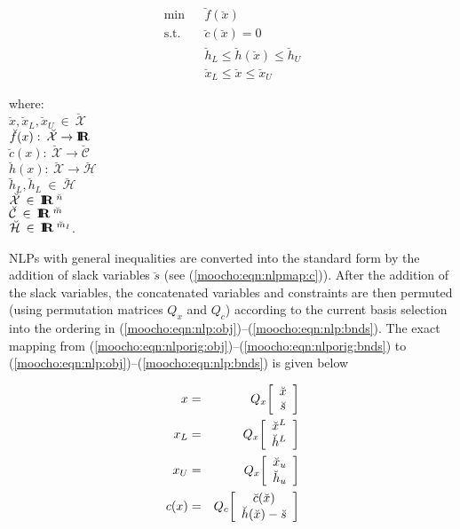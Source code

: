\documentclass[pdf,ps2pdf,11pt]{SANDreport}
\begin{document}
{{\bsinglespace
\begin{eqnarray}
\mbox{min}  &  & \breve{f}(\breve{x})                                     \label{moocho:eqn:nlporig:obj} \\
\mbox{s.t.} &  & \breve{c}(\breve{x}) = 0                                 \label{moocho:eqn:nlporig:equ} \\
            &  & \breve{h}_L \leq \breve{h}(\breve{x}) \leq \breve{h}_U   \label{moocho:eqn:nlporig:inequ} \\
            &  & \breve{x}_L \leq \breve{x}            \leq \breve{x}_U   \label{moocho:eqn:nlporig:bnds}
\end{eqnarray}
\begin{tabbing}
\hspace{4ex}where:\hspace{5ex}\= \\
\>	$\breve{x}, \breve{x}_L, \breve{x}_U \:\in\:\breve{\mathcal{X}}$ \\
\>	$\breve{f}(x) : \:\breve{\mathcal{X}} \rightarrow \mbox{\textbf{I}}\hspace{-0.6ex}\mbox{\textbf{R}}$ \\
\>	$\breve{c}(x) : \:\breve{\mathcal{X}} \rightarrow \breve{\mathcal{C}}$ \\
\>	$\breve{h}(x) : \:\breve{\mathcal{X}} \rightarrow \breve{\mathcal{H}}$ \\
\>	$\breve{h}_L, \breve{h}_L \:\in\:\breve{\mathcal{H}}$ \\
\>	$\breve{\mathcal{X}} \:\in\:\mbox{\textbf{I}}\hspace{-0.6ex}\mbox{\textbf{R}}\:^{\breve{n}}$ \\
\>	$\breve{\mathcal{C}} \:\in\:\mbox{\textbf{I}}\hspace{-0.6ex}\mbox{\textbf{R}}\:^{\breve{m}}$ \\
\>	$\breve{\mathcal{H}} \:\in\:\mbox{\textbf{I}}\hspace{-0.6ex}\mbox{\textbf{R}}\:^{\breve{m}_I}$.
\end{tabbing}
\esinglespace}

NLPs with general inequalities are converted into the standard form by
the addition of slack variables $\breve{s}$ (see
(\ref{moocho:eqn:nlpmap:c})).  After the addition of the slack
variables, the concatenated variables and constraints are then
permuted (using permutation matrices $Q_x$ and $Q_c$) according to the
current basis selection into the ordering in
(\ref{moocho:eqn:nlp:obj})--(\ref{moocho:eqn:nlp:bnds}).  The exact
mapping from
(\ref{moocho:eqn:nlporig:obj})--(\ref{moocho:eqn:nlporig:bnds}) to
(\ref{moocho:eqn:nlp:obj})--(\ref{moocho:eqn:nlp:bnds}) is given below

{\bsinglespace
\begin{eqnarray}
x & = & Q_x {\bmat{c} \breve{x} \\ \breve{s} \emat} \label{moocho:eqn:nlpmap:x} \\
x_L & = & Q_x {\bmat{c} \breve{x}^L \\ \breve{h}^L \emat} \label{moocho:eqn:nlpmap:xl} \\
x_U & = & Q_x {\bmat{c} \breve{x}_u \\ \breve{h}_u \emat} \label{moocho:eqn:nlpmap:xu} \\
c(x) & = & Q_c {\bmat{c} \breve{c}(\breve{x}) \\ \breve{h}(\breve{x}) - \breve{s} \emat}
	\label{moocho:eqn:nlpmap:c}
\end{eqnarray}
\esinglespace}

}
\end{document}
